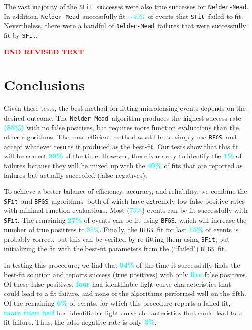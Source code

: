 \documentclass[preprint]{aastex631}
\newcommand{\HL}[1]{\textcolor{red}{\bf#1}}
\newcommand{\num}[1]{\textcolor{cyan}{\bf#1}}
\newcommand{\neldarmead}{\texttt{Nelder-Mead}}
\newcommand{\bfgs}{\texttt{BFGS}}
\newcommand{\sfit}{\texttt{SFit}}
\begin{document}
The vast majority of the \sfit\, successes were also true successes for \neldarmead. In addition, \neldarmead\, successfully fit \num{$\sim 40\%$} of events that \sfit\, failed to fit. Nevertheless, there were a handful of \neldarmead\, failures that were successfully fit by \sfit.

\HL{END REVISED TEXT}

{\section{Conclusions}
\label{sec:recommendations}}

Given these tests, the best method for fitting microlensing events depends on the desired outcome. The \neldarmead\, algorithm produces the highest success rate \num{(85\%)} with no false positives, but requires more function evaluations than the other algorithms. The most efficient method would be to simply use \bfgs\, and accept whatever results it produced as the best-fit. Our tests show that this fit will be correct \num{99\%} of the time. However, there is no way to identify the \num{1\%} of failures because they will be mixed up with the \num{40\%} of fits that are reported as failures but actually succeeded (false negatives). 

To achieve a better balance of efficiency, accuracy, and reliability, we combine the \sfit\, and \bfgs\, algorithms, both of which have extremely low false positive rates with minimal function evaluations. Most (\num{$73\%$}) events can be fit successfully with \sfit. The remaining \num{27\%} of events can be fit using \bfgs, which will increase the number of true positives to \num{$85\%$}. Finally, the \bfgs\, fit for last \num{15\%} of events is probably correct, but this can be verified by re-fitting them using \sfit, but initializing the fit with the 
 best-fit parameters from the (``failed") \bfgs\, fit.
 
In testing this procedure, we find that \num{94\%} of the time it successfully finds the best-fit solution and reports success (true positives) with only \num{five} false positives. Of these false positives, \num{four} had identifiable light curve characteristics that could lead to a fit failure, and none of the algorithms performed well on the fifth. Of the remaining \num{6\%} of events, for which this procedure reports a failed fit, \num{more than half} had identifiable light curve characteristics that could lead to a fit failure. Thus, the false negative rate is only \num{3\%}. 
\end{document}
